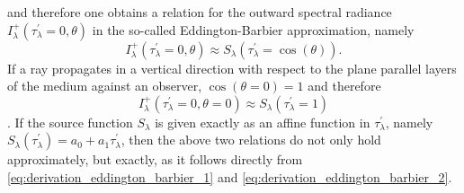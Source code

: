 \documentclass[a4paper,11pt]{report}
\def\lk#1{{\color{black}{#1}}}
\begin{document}
\begin{align}
\begin{aligned}
\end{aligned}\end{align} and therefore one obtains a relation for the outward spectral radiance $I_\lambda^+(\tau_\lambda^\prime = 0,\theta)$ in the so-called Eddington-Barbier approximation, namely \begin{equation}
I_\lambda^+(\tau_\lambda^\prime = 0,\theta) \approx S_\lambda(\tau_\lambda^\prime = \cos(\theta)).
\end{equation} If a ray propagates in a vertical direction with respect to the plane parallel layers of the medium against an observer, $\cos(\theta=0) = 1$ and therefore \begin{equation}
I_\lambda^+(\tau_\lambda^\prime = 0, \theta=0) \approx S_\lambda(\tau_\lambda^\prime = 1)
\end{equation} \lk{holds}. If the source function $S_\lambda$ is given exactly as an affine function in $\tau_\lambda^\prime$, namely $S_\lambda(\tau_\lambda^\prime) = a_0 + a_1\tau_\lambda^\prime$, then the above two relations do not only hold approximately, but exactly, as it follows directly from \cref{eq:derivation_eddington_barbier_1} and \cref{eq:derivation_eddington_barbier_2}.
\end{document}
